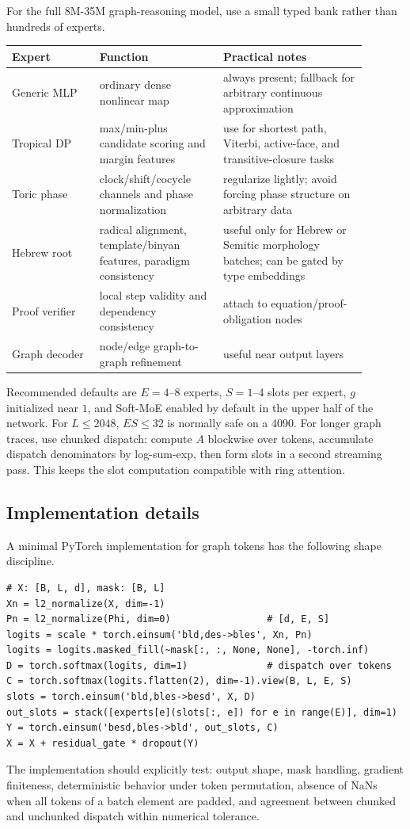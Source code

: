 \documentclass[11pt]{article}
\theoremstyle{definition}
\theoremstyle{plain}
\theoremstyle{remark}
\numberwithin{equation}{section}
\begin{document}
For the full 8M-35M graph-reasoning model, use a small typed bank rather than hundreds of experts.
\begin{longtable}{p{0.22\linewidth}p{0.31\linewidth}p{0.36\linewidth}}
\toprule
Expert & Function & Practical notes \\
\midrule
\endhead
Generic MLP & ordinary dense nonlinear map & always present; fallback for arbitrary continuous approximation \\
Tropical DP & max/min-plus candidate scoring and margin features & use for shortest path, Viterbi, active-face, and transitive-closure tasks \\
Toric phase & clock/shift/cocycle channels and phase normalization & regularize lightly; avoid forcing phase structure on arbitrary data \\
Hebrew root & radical alignment, template/binyan features, paradigm consistency & useful only for Hebrew or Semitic morphology batches; can be gated by type embeddings \\
Proof verifier & local step validity and dependency consistency & attach to equation/proof-obligation nodes \\
Graph decoder & node/edge graph-to-graph refinement & useful near output layers \\
\bottomrule
\end{longtable}

Recommended defaults are $E=4$--$8$ experts, $S=1$--$4$ slots per expert, $g$ initialized near $1$, and Soft-MoE enabled by default in the upper half of the network.  For $L\le2048$, $E S\le32$ is normally safe on a 4090.  For longer graph traces, use chunked dispatch: compute $A$ blockwise over tokens, accumulate dispatch denominators by log-sum-exp, then form slots in a second streaming pass.  This keeps the slot computation compatible with ring attention.

\subsection{Implementation details}

A minimal PyTorch implementation for graph tokens has the following shape discipline.
\begin{verbatim}
# X: [B, L, d], mask: [B, L]
Xn = l2_normalize(X, dim=-1)
Pn = l2_normalize(Phi, dim=0)                 # [d, E, S]
logits = scale * torch.einsum('bld,des->bles', Xn, Pn)
logits = logits.masked_fill(~mask[:, :, None, None], -torch.inf)
D = torch.softmax(logits, dim=1)              # dispatch over tokens
C = torch.softmax(logits.flatten(2), dim=-1).view(B, L, E, S)
slots = torch.einsum('bld,bles->besd', X, D)
out_slots = stack([experts[e](slots[:, e]) for e in range(E)], dim=1)
Y = torch.einsum('besd,bles->bld', out_slots, C)
X = X + residual_gate * dropout(Y)
\end{verbatim}
The implementation should explicitly test: output shape, mask handling, gradient finiteness, deterministic behavior under token permutation, absence of NaNs when all tokens of a batch element are padded, and agreement between chunked and unchunked dispatch within numerical tolerance.
\end{document}
